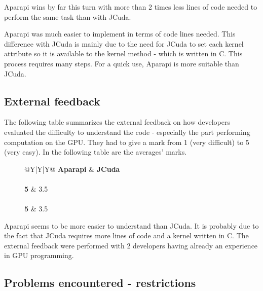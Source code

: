 Aparapi wins by far this turn with more than 2 times less lines of code needed to perform the same task than with JCuda.

Aparapi was much easier to implement in terms of code lines needed. This difference with JCuda is mainly due to the need for JCuda to set each kernel attribute so it is available to the kernel method - which is written in C. This process requires many steps. For a quick use, Aparapi is more suitable than JCuda.

\subsection{External feedback}

The following table summarizes the external feedback on how developers evaluated the difficulty to understand the code - especially the part performing computation on the GPU. They had to give a mark from 1 (very difficult) to 5 (very easy). In the following table are the averages' marks.

\begin{figure}[H]
\begin{tabularx}{\textwidth}{@{}Y|Y|Y@{}}
	\textbf{Aparapi} & \textbf{JCuda} \\
	\hline \hline
	 \\
	\textcolor{OliveGreen}{\textbf{5}} & \textcolor{BrickRed}{3.5} \\
	\hline
	 \\
	\textcolor{OliveGreen}{\textbf{5}} & \textcolor{BrickRed}{3.5} \\
	\hline
	
\end{tabularx}
\end{figure}

Aparapi seems to be more easier to understand than JCuda. It is probably due to the fact that JCuda requires more lines of code and a kernel written in C. The external feedback were performed with 2 developers having already an experience in GPU programming.

\subsection{Problems encountered - restrictions}

